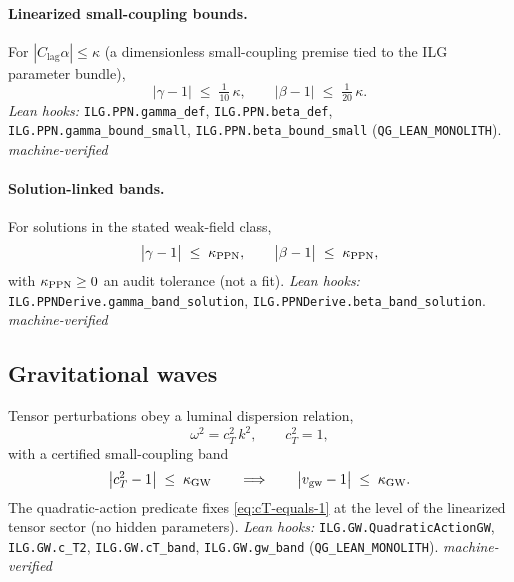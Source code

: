 \documentclass[12pt,a4paper]{article}
\begin{document}
\paragraph{Linearized small-coupling bounds.}
For \(|C_{\!\mathrm{lag}}\alpha| \le \kappa\) (a dimensionless small-coupling premise tied to the ILG parameter bundle),
\begin{equation}
  \bigl|\gamma - 1\bigr| \;\le\; \tfrac{1}{10}\,\kappa,
  \qquad
  \bigl|\beta - 1\bigr| \;\le\; \tfrac{1}{20}\,\kappa.
  \label{eq:ppn-linear-bounds}
\end{equation}
\emph{Lean hooks:} \texttt{ILG.PPN.gamma\_def}, \texttt{ILG.PPN.beta\_def}, \texttt{ILG.PPN.gamma\_bound\_small}, \texttt{ILG.PPN.beta\_bound\_small} (\texttt{QG\_LEAN\_MONOLITH}). \emph{machine-verified}

\paragraph{Solution-linked bands.}
For solutions in the stated weak-field class,
\begin{equation}
  \bigl|\gamma-1\bigr| \;\le\; \kappa_{\rm PPN},
  \qquad
  \bigl|\beta-1\bigr| \;\le\; \kappa_{\rm PPN},
  \label{eq:ppn-solution-bands}
\end{equation}
with \(\kappa_{\rm PPN}\ge 0\) an audit tolerance (not a fit). \emph{Lean hooks:} \texttt{ILG.PPNDerive.gamma\_band\_solution}, \texttt{ILG.PPNDerive.beta\_band\_solution}. \emph{machine-verified}

\subsection{Gravitational waves}
Tensor perturbations obey a luminal dispersion relation,
\begin{equation}
  \omega^2 = c_T^2\,k^2,\qquad c_T^2=1,
  \label{eq:cT-equals-1}
\end{equation}
with a certified small-coupling band
\begin{equation}
  \bigl|c_T^2-1\bigr| \;\le\; \kappa_{\rm GW}
  \qquad\Longrightarrow\qquad
  \bigl|v_{\rm gw}-1\bigr| \;\le\; \kappa_{\rm GW}.
  \label{eq:gw-band}
\end{equation}
The quadratic-action predicate fixes \eqref{eq:cT-equals-1} at the level of the linearized tensor sector (no hidden parameters). \emph{Lean hooks:} \texttt{ILG.GW.QuadraticActionGW}, \texttt{ILG.GW.c\_T2}, \texttt{ILG.GW.cT\_band}, \texttt{ILG.GW.gw\_band} (\texttt{QG\_LEAN\_MONOLITH}). \emph{machine-verified}
\end{document}
